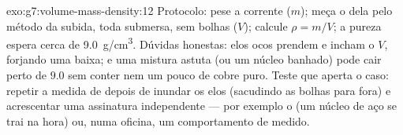 \begin{solution}{exo:g7:volume-mass-density:12}
Protocolo: pese a corrente ($m$); meça o  dela pelo método da
subida, toda submersa, sem bolhas ($V$); calcule $\rho = m/V$; a
pureza espera cerca de \qty{9.0}{g/cm^3}. Dúvidas honestas: elos ocos
prendem  e incham o $V$, forjando uma  baixa; e uma
mistura astuta (ou um núcleo banhado) pode cair perto de $9.0$ sem
conter nem um pouco de cobre puro. Teste que aperta o caso: repetir a
medida de  depois de inundar os elos (sacudindo as bolhas para
fora) e acrescentar uma assinatura independente --- por exemplo o 
(um núcleo de aço se trai na hora) ou, numa oficina, um comportamento
de  medido.
\end{solution}

